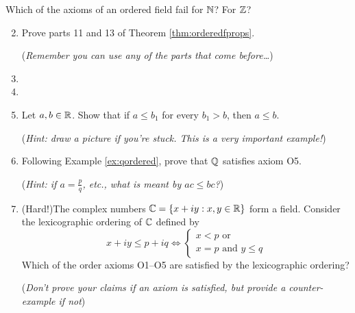 \begin{exercisessec}{}{}
	\exstart %
	Which of the axioms of an ordered field fail for $\mathbb{N}$? For $\mathbb{Z}$?
	
	\begin{enumerate}\setcounter{enumi}{1}
	  \item%
	  Prove parts 11 and 13 of Theorem \ref{thm:orderedfprops}.\par%
	  (\emph{Remember you can use any of the parts that come before\ldots})
	
	  \item%
	
	  \item%
	
	  \item%
	  Let $a,b\in\mathbb{R}$. Show that if $a\le b_1$ for every $b_1>b$, then $a\le b$.\par
	  (\emph{Hint: draw a picture if you're stuck. This is a very important example!})
	  
	  \item Following Example \ref{ex:qordered}, prove that $\mathbb{Q}$ satisfies axiom O5.\par
	  (\emph{Hint: if $a=\frac pq$, etc., what is meant by $ac\le bc$?}) 
	  
	  \item (Hard!)\lstsp The complex numbers $\mathbb{C}=\{x+iy:x,y\in\mathbb{R}\}$ form a field. Consider the lexicographic ordering of $\mathbb{C}$ defined by
	  \[x+iy\le p+iq\iff\begin{cases}
	  x<p\text{ or}\\
	  x=p\text{ and }y\le q
	  \end{cases}\]
	  Which of the order axioms O1--O5 are satisfied by the lexicographic ordering?\par
	  (\emph{Don't prove your claims if an axiom is satisfied, but provide a counter-example if not})
	\end{enumerate}
\end{exercisessec}

